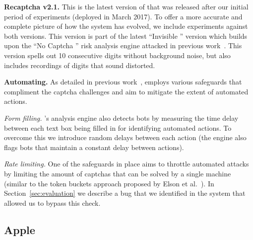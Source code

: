 \textbf{Recaptcha v2.1.} This is the latest version of \re that was released after our initial period of experiments (deployed in March 2017).
To offer a more accurate and complete picture of how the system has evolved, we include experiments against both versions.
This version is part of the latest ``Invisible \re'' version which builds upon the ``No Captcha \re'' risk analysis engine attacked in 
previous work~\cite{sivakorn:eurosp16}. This version spells out 10 consecutive digits without background noise, but also includes
recordings of digits that sound distorted.


\textbf{Automating.} As detailed in previous work~\cite{sivakorn:eurosp16}, \re employs various
safeguards that compliment the captcha challenges and aim to mitigate the extent of automated 
actions.

\emph{Form filling.} \re's analysis engine also detects bots by measuring the time delay between
each text box being filled in for identifying automated actions. To overcome this we introduce 
random delays between each action (the engine also flags bots that maintain a constant delay 
between actions).

\emph{Rate limiting.} One of the safeguards in place aims to throttle automated attacks by limiting 
the amount of captchas that can be solved by a single machine (similar to the token buckets approach proposed by
Elson et al.~\cite{asirra}). In Section~\ref{sec:evaluation} we describe a bug that we identified in the system
that allowed us to bypass this check.

\subsection{Apple}

